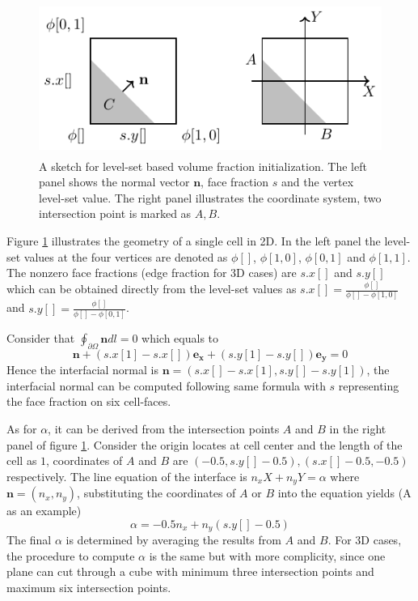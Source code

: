\begin{figure}[H]
  \centering
  \includegraphics[height=5cm]{./image/fractions-h/normal.pdf}
  \caption{A sketch for level-set based volume fraction initialization. The left panel shows the normal vector $\mathbf{n}$, face fraction $s$ and the vertex level-set value. The right panel illustrates the coordinate system, two intersection point is marked as $A,B$.}
  \label{fig:fractions-normal}
\end{figure}

Figure \ref{fig:fractions-normal} illustrates the geometry of a single cell in 2D. In the left panel the level-set values at the four vertices are denoted as $\phi[]$, $\phi[1,0]$, $\phi[0,1]$ and $\phi[1,1]$. The nonzero face fractions (edge fraction for 3D cases) are $s.x[]$ and $s.y[]$ which can be obtained directly from the level-set values as $s.x[] = \frac{\phi[]}{\phi[]-\phi[1,0]}$ and $s.y[] = \frac{\phi[]}{\phi[]-\phi[0,1]}$. 

Consider that $\oint_{\partial \Omega}\mathbf{n}dl = 0$ which equals to
\begin{equation}
  \mathbf{n} + (s.x[1]-s.x[])\mathbf{e_x} + (s.y[1]-s.y[])\mathbf{e_y} = 0
\end{equation}
Hence the interfacial normal is $\mathbf{n} = (s.x[]-s.x[1],s.y[]-s.y[1])$, the interfacial normal can be computed following same formula with $s$ representing the face fraction on six cell-faces. 

As for $\alpha$, it can be derived from the intersection points $A$ and $B$ in the right panel of figure \ref{fig:fractions-normal}. Consider the origin locates at cell center and the length of the cell as $1$, coordinates of $A$ and $B$ are $(-0.5,s.y[]-0.5),(s.x[]-0.5,-0.5)$ respectively. The line equation of the interface is $n_x X + n_y Y = \alpha$ where $\mathbf{n} = (n_x,n_y)$, substituting the coordinates of $A$ or $B$ into the equation yields (A as an example)
\begin{equation}  
  \alpha = -0.5n_x + n_y (s.y[]-0.5)
\end{equation}
The final $\alpha$ is determined by averaging the results from $A$ and $B$. For 3D cases, the procedure to compute $\alpha$ is the same but with more complicity, since one plane can cut through a cube with minimum three intersection points and maximum six intersection points.

